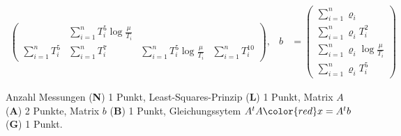 \begin{loesung}
\begin{align*}
\begin{pmatrix}
			&\displaystyle \sum_{i=1}^n T_i^5\log\frac{\mu}{T_i}
\\
\displaystyle\sum_{i=1}^n T_i^5 
	&\displaystyle \sum_{i=1}^n T_i^7
		&\displaystyle \sum_{i=1}^n T_i^5\log\frac{\mu}{T_i}
			&\displaystyle \sum_{i=1}^nT_i^{10}
\end{pmatrix},
&
b
&=
\begin{pmatrix}
\displaystyle\sum_{i=1}^n \varrho_i \\
\displaystyle\sum_{i=1}^n \varrho_i T_i^2 \\
\displaystyle\sum_{i=1}^n \varrho_i \log\frac{\mu}{T_i} \\
\displaystyle\sum_{i=1}^n \varrho_i T_i^5
\end{pmatrix}
\end{align*}
\end{loesung}

\begin{bewertung}
Anzahl Messungen ({\bf N}) 1 Punkt,
Least-Squares-Prinzip ({\bf L}) 1 Punkt,
Matrix $A$ ({\bf A}) 2 Punkte,
Matrix $b$ ({\bf B}) 1 Punkt,
Gleichungssytem $A^tA{\color{red}}x=A^tb$ ({\bf G}) 1 Punkt.
\end{bewertung}
